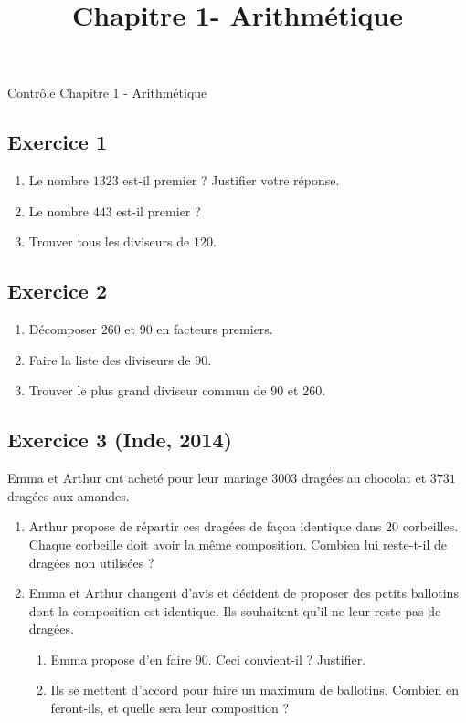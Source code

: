 \documentclass[14 pt]{extarticle}
\title{Chapitre 1-  Arithmétique}
\date{}
\theoremstyle{plain}
\begin{document}
\begin{center}{\Large Contrôle Chapitre 1 - Arithmétique}\\ 
 \end{center} 
\subsection*{Exercice 1} 
 
 \begin{enumerate}
 \item Le nombre $1323$ est-il premier ? Justifier votre réponse. 
 \item Le nombre $443$ est-il premier ? 
 \item Trouver tous les diviseurs de $120$. 
 \end{enumerate}
 
\subsection*{Exercice 2} 
\begin{enumerate}
\item Décomposer $260$ et $90$ en facteurs premiers. 
\item Faire la liste des diviseurs de $90$. 
\item Trouver le plus grand diviseur commun de $90$ et $260$.
\end{enumerate} 

 
 \subsection*{Exercice 3 (Inde, 2014)}
 
 Emma et Arthur ont acheté pour leur mariage
 $3 003$ dragées au chocolat et 
 $3 731$ dragées aux amandes. 
 
 \begin{enumerate}
 \item[1.] Arthur propose de répartir ces dragées de
 façon identique dans $20$ corbeilles. 
 Chaque corbeille doit avoir la même composition. Combien lui reste-t-il de dragées non utilisées ? 
 \item[2.] Emma et Arthur changent d'avis et décident de proposer des petits ballotins dont la composition est identique. Ils souhaitent qu'il ne leur reste pas de dragées. \begin{enumerate}
 \item[a.)] Emma propose d'en faire $90$. Ceci convient-il ? Justifier. 
 \item[b.)] Ils se mettent d'accord pour faire un maximum de ballotins. Combien en feront-ils, et quelle sera leur composition ? 
 \end{enumerate}
 \end{enumerate}
 
\end{document}
